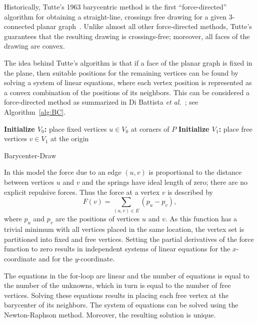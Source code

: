 \documentclass[notitlepage,letter,11pt]{article}
\begin{document}
Historically, Tutte's 1963 barycentric method is the
first ``force-directed'' algorithm for obtaining a straight-line,
crossings free drawing for a given 3-connected planar graph~\cite{t-hdg-63}. Unlike
almost all other force-directed methods, Tutte's guarantees that the
resulting drawing is crossings-free; moreover, all faces of the
drawing are convex.

The idea behind Tutte's algorithm is that if a face of the planar
graph is fixed in the plane, then suitable positions for the remaining
vertices can be found by solving a system of linear equations, where
each vertex position is represented as a convex combination of the
positions of its neighbors. This can be considered a force-directed
method as summarized in Di Battista {\em et al.}~\cite{dett-gd}; see Algorithm~\ref{alg:BC}.

\begin{algorithm}
{\bf Initialize $V_0$:} place fixed vertices $u\in V_0$ at corners of $P$\;
{\bf Initialize $V_1$:} place free vertices $v\in V_1$ at the origin\;
\caption{Barycenter-Draw\label{alg:BC}}
\end{algorithm}

In this model the force due to an edge $(u,v)$ is proportional to the
distance between vertices $u$ and $v$ and the springs have ideal
length of zero; there are no explicit repulsive forces. Thus the force
at a vertex $v$ is described by $$F(v)=\sum_{(u,v)\in E}(p_u - p_v),$$
where $p_u$ and $p_v$ are the positions of vertices $u$ and $v$. As
this function has a trivial minimum with all vertices placed in the
same location, the vertex set is partitioned into fixed and free
vertices. Setting the partial derivatives of the force function to
zero results in independent systems of linear equations for the
$x$-coordinate and for the $y$-coordinate.

The equations in the for-loop are linear and the number of equations
is equal to the number of the unknowns, which in turn is equal to the
number of free vertices. Solving these equations results in placing
each free vertex at the barycenter of its neighbors. The system of
equations can be solved using the Newton-Raphson method. Moreover, the
resulting solution is unique. 
\end{document}
